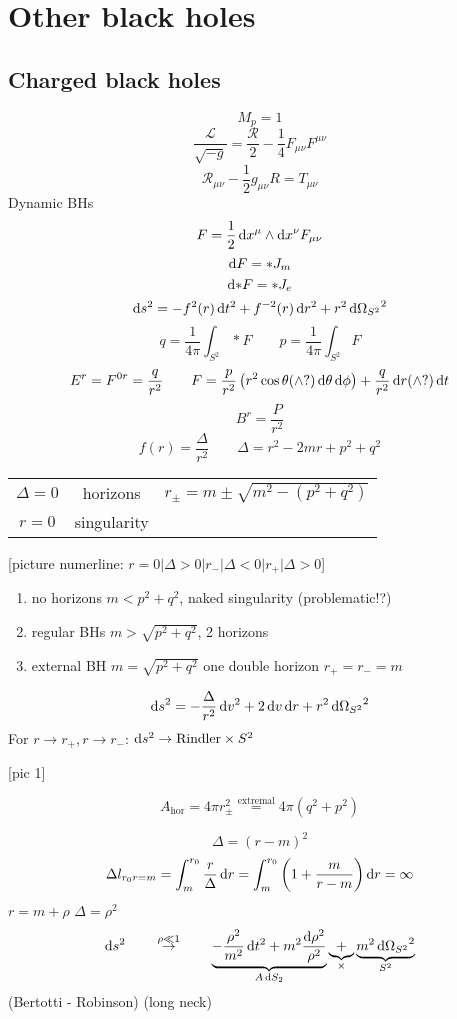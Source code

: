\chapter{Other black holes}
\section{Charged black holes}
\[ M_p = 1 \]
\[ \frac{\mathcal{L}}{\sqrt{-g}} = \frac{\mathcal{R}}{2} - \frac{1}{4}F_{\mu\nu}F^{\mu\nu} \]
\[ \mathcal{R}_{\mu\nu} - \frac{1}{2}g_{\mu\nu} R = T_{\mu\nu} \]
Dynamic BHs
\[F = \frac{1}{2}\operatorname{d \!}{x}^\mu \wedge \operatorname{d \!}{x}^\nu F_{\mu\nu} \]
\[ \operatorname{d \!}{F} = *J_m \]
\[ \operatorname{d \!}{*F} = *J_e \]
\[ \operatorname{d \!}{s}^2 = - f^2(r) \operatorname{d \!}{t}^2 + f^{-2}(r)\operatorname{d \!}{r}^2 + r^2 \operatorname{d \!}{\Omega_{S^2}}^2 \]
\[ q = \frac{1}{4\pi}\int_{S^2}*F \qquad p = \frac{1}{4\pi}\int_{S^2}F \]
\[ E^r = F^{0r} = \frac{q}{r^2} \qquad F= \frac{p}{r^2}\left(r^2 \cos\theta (\wedge ?) \operatorname{d \!}{\theta}\operatorname{d \!}{\phi}\right) + \frac{q}{r^2}\operatorname{d \!}{r}(\wedge ?)\operatorname{d \!}{t} \]
\[ B^r = \frac{P}{r^2} \]
\[ f(r) = \frac{\Delta}{r^2} \qquad \Delta = r^2 - 2mr + p^2 + q^2 \]

\begin{tabular}{c | c | c}
$\Delta = 0$ & horizons & $r_\pm = m \pm \sqrt{m^2 - (p^2+q^2)}$ \\
$r = 0$ & singularity
\end{tabular}

[picture numerline: $r=0 | \Delta >0 | r_- | \Delta<0 | r_+ | \Delta > 0$]

\begin{enumerate}
\item no horizons $m < p^2 + q^2$, naked singularity (problematic!?)
\item regular BHs $m > \sqrt{p^2 + q^2}$, 2 horizons
\item external BH $m = \sqrt{p^2 +q^2}$ one double horizon $r_+ = r_- = m$
\end{enumerate}

\[ \operatorname{d \!}{s}^2 = - \frac{\Delta}{r^2}\operatorname{d \!}{v}^2 + 2 \operatorname{d \!}{v}\operatorname{d \!}{r} + r^2 \operatorname{d \!}{\Omega_{S^2}}^2 \]
For $r\to r_+, r \to r_-$: $\operatorname{d \!}{s}^2 \to \text{Rindler} \times S^2$

[pic 1]

\[A_\text{hor} = 4\pi r^2_{\pm} \overset{\text{extremal}}{=} 4\pi(q^2 + p^2)\]

\[ \Delta = (r-m)^2 \]
\[ \Delta l_{r_0 r=m} = \int^{r_0}_m \frac{r}{\Delta}\operatorname{d \!}{r} = \int^{r_0}_m \left(1+ \frac{m}{r-m}\right)\operatorname{d \!}{r} = \infty \]
$r = m + \rho$ $\Delta = \rho^2$
\[\operatorname{d \!}{s}^2 \qquad \overset{\rho \ll 1}{\to} \qquad \underbrace{- \frac{\rho^2}{m^2}\operatorname{d \!}{t}^2 + m^2 \frac{\operatorname{d \!}{\rho}^2}{\rho^2}}_{A \operatorname{d \!}{S_2}} \underbrace{+}_{\times} \underbrace{m^2 \operatorname{d \!}{\Omega_{S^2}}^2}_{S^2}\]
(Bertotti - Robinson) (long neck)


